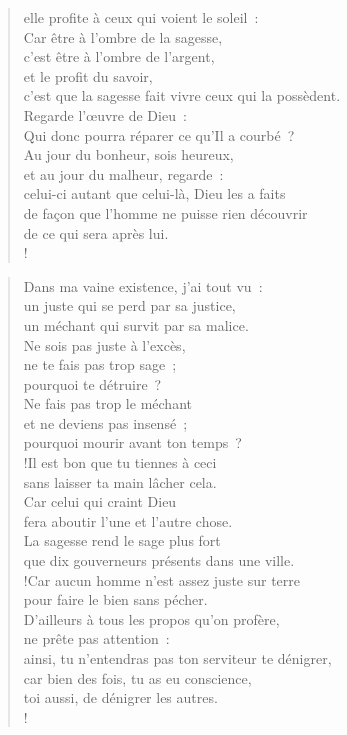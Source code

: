 \documentclass[french,twoside]{book} %
\def\mednobreak{\ifdim\lastskip<\medskipamount
  \removelastskip\nopagebreak\medskip\fi}
\newcommand{\labelblock}[1]{\medbreak{\noindent\color{rubric}\bfseries #1}\par\mednobreak}
\begin{document}
\begin{verse}
elle profite à ceux qui voient le soleil :\\
Car être à l’ombre de la sagesse, \\
c’est être à l’ombre de l’argent, \\
et le profit du savoir, \\
c’est que la sagesse fait vivre ceux qui la possèdent.\\
Regarde l’œuvre de Dieu : \\
Qui donc pourra réparer ce qu’Il a courbé ?\\
Au jour du bonheur, sois heureux, \\
et au jour du malheur, regarde : \\
celui-ci autant que celui-là, Dieu les a faits \\
de façon que l’homme ne puisse rien découvrir \\
de ce qui sera après lui.\\!
\end{verse}

\labelblock{Justice et sagesse}


\begin{verse}
Dans ma vaine existence, j’ai tout vu : \\
un juste qui se perd par sa justice, \\
un méchant qui survit par sa malice.\\
Ne sois pas juste à l’excès, \\
ne te fais pas trop sage ; \\
pourquoi te détruire ?\\
Ne fais pas trop le méchant \\
et ne deviens pas insensé ; \\
pourquoi mourir avant ton temps ?\\!Il est bon que tu tiennes à ceci \\
sans laisser ta main lâcher cela. \\
Car celui qui craint Dieu \\
fera aboutir l’une et l’autre chose.\\
La sagesse rend le sage plus fort \\
que dix gouverneurs présents dans une ville.\\!Car aucun homme n’est assez juste sur terre \\
pour faire le bien sans pécher.\\
D’ailleurs à tous les propos qu’on profère, \\
ne prête pas attention : \\
ainsi, tu n’entendras pas ton serviteur te dénigrer,\\
car bien des fois, tu as eu conscience, \\
toi aussi, de dénigrer les autres.\\!
\end{verse}
\end{document}
